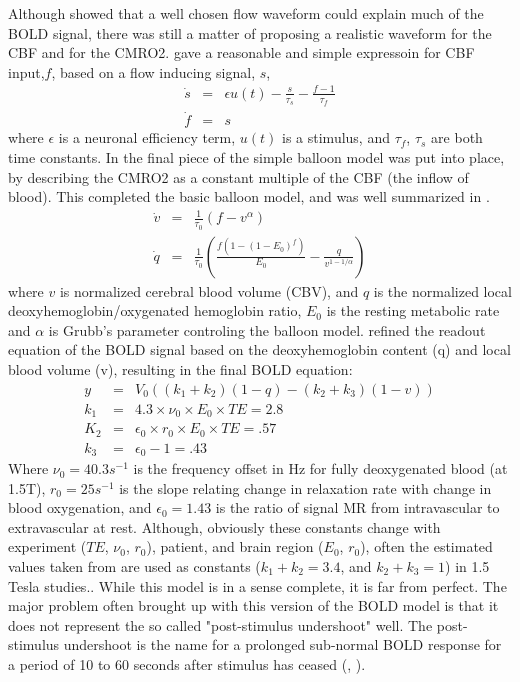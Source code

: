 \documentclass{article}
\begin{document}
Although \cite{Buxton1998} showed that a well chosen flow waveform could 
explain much of the BOLD signal, there was still a matter of proposing a
realistic waveform for the CBF and for the CMRO2. \cite{friston2000} gave
a reasonable and simple
expressoin for CBF input,$f$, based on a flow inducing signal, $s$, 
\begin{eqnarray}
\dot{s} &=& \epsilon u(t) - \frac{s}{\tau_s} - \frac{f - 1}{\tau_f} \\
\dot{f} &=& s
\end{eqnarray}
where $\epsilon$ is a neuronal efficiency term, $u(t)$ is a stimulus, and $\tau_f$, $\tau_s$
are both time constants. In \cite{Buxton2004} the final piece of the simple balloon
model was put into place, by describing the CMRO2 as a constant multiple of
the CBF (the inflow of blood). This completed the basic balloon model, and 
was well summarized in \cite{Riera2004}. 
\begin{eqnarray}
\dot{v} &=& \frac{1}{\tau_0}(f - v^\alpha)\\
\dot{q} &=& \frac{1}{\tau_0}(\frac{f(1-(1-E_0)^f)}{E_0} - \frac{q}{v^{1-1/\alpha}})
\end{eqnarray}
where $v$ is normalized cerebral blood volume (CBV), and $q$ is the normalized
local deoxyhemoglobin/oxygenated hemoglobin ratio, $E_0$ is the resting metabolic
rate and $\alpha$ is Grubb's parameter controling the balloon model. 
\cite{Obata2004} refined the readout equation of the BOLD signal based on the
deoxyhemoglobin content (q) and local blood volume (v), resulting in the
final BOLD equation:
\begin{eqnarray}
y   &=& V_0((k_1 + k_2)(1-q) - (k_2 + k_3)(1-v))\\
k_1 &=& 4.3 \times \nu_0 \times E_0 \times TE = 2.8\\
K_2 &=& \epsilon_0 \times r_0 \times E_0 \times TE = .57\\
k_3 &=& \epsilon_0 - 1 = .43
\end{eqnarray}
Where $\nu_0 = 40.3 s^{-1}$  is the frequency offset in Hz for fully
deoxygenated blood (at 1.5T), $r_0 = 25 s^{-1}$  is the slope relating
change in relaxation rate with change in blood oxygenation, and
$\epsilon_0 = 1.43$ is the 
ratio of signal MR from intravascular to extravascular at rest. Although,
obviously these constants change with experiment ($TE$, $\nu_0$, $r_0$),
patient, and brain 
region ($E_0$, $r_0$), often the estimated values taken from \cite{Obata2004} are used
as constants ($k_1 + k_2 = 3.4$, and $k_2+k_3 = 1$) in 1.5 Tesla studies..
While this model is in a sense complete, it is far from perfect. The major
problem often brought up with this version of the BOLD model is that it
does not represent the so called "post-stimulus undershoot" well.
The post-stimulus undershoot is the name for a prolonged sub-normal
BOLD response for a period of 10 to 60 seconds after stimulus has
ceased (\cite{Chen2009}, \cite{Mandeville1999a}).
\end{document}
